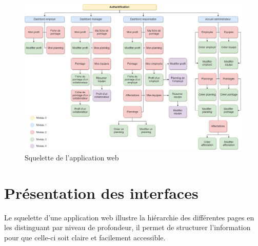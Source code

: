     \clearpage
    \thispagestyle{empty}
        \begin{landscape}
            \begin{figure}[h!]
                         \centering
                            \includegraphics[scale=0.44 ]{images/interface/arbre.png}
                         \caption{Squelette de l'application web}
                         \label{fig90}
            \end{figure}  
        \end{landscape}
    \clearpage
    
\section{Présentation des interfaces}
     Le squelette d’une application web  illustre la hiérarchie des différentes pages en les distinguant par niveau de profondeur, il permet de structurer l’information pour que celle-ci soit claire et facilement accessible.

